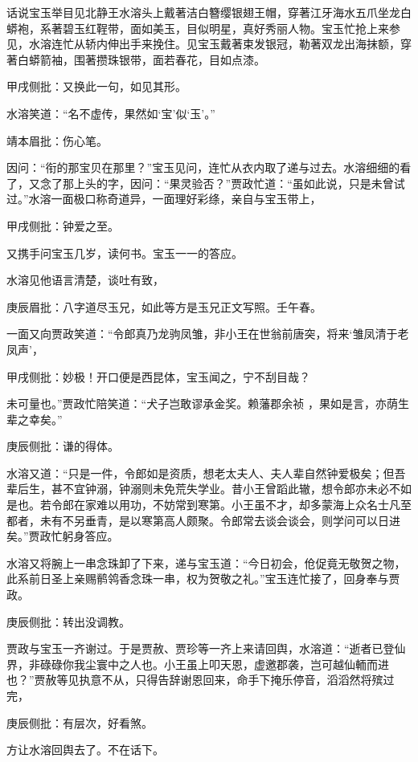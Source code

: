 \begin{parag}
    话说宝玉举目见北静王水溶头上戴著洁白簪缨银翅王帽，穿著江牙海水五爪坐龙白蟒袍，系著碧玉红鞓带，面如美玉，目似明星，真好秀丽人物。宝玉忙抢上来参见，水溶连忙从轿内伸出手来挽住。见宝玉戴著束发银冠，勒著双龙出海抹额，穿著白蟒箭袖，围著攒珠银带，面若春花，目如点漆。\begin{note}甲戌侧批：又换此一句，如见其形。\end{note}水溶笑道：“名不虚传，果然如‘宝’似‘玉’。”\begin{note}靖本眉批：伤心笔。\end{note}因问：“衔的那宝贝在那里？”宝玉见问，连忙从衣内取了递与过去。水溶细细的看了，又念了那上头的字，因问：“果灵验否？”贾政忙道：“虽如此说，只是未曾试过。”水溶一面极口称奇道异，一面理好彩绦，亲自与宝玉带上，\begin{note}甲戌侧批：钟爱之至。\end{note}又携手问宝玉几岁，读何书。宝玉一一的答应。
\end{parag}


\begin{parag}
    水溶见他语言清楚，谈吐有致，\begin{note}庚辰眉批：八字道尽玉兄，如此等方是玉兄正文写照。壬午春。\end{note}一面又向贾政笑道：“令郎真乃龙驹凤雏，非小王在世翁前唐突，将来‘雏凤清于老凤声’，\begin{note}甲戌侧批：妙极！开口便是西昆体，宝玉闻之，宁不刮目哉？\end{note}未可量也。”贾政忙陪笑道：“犬子岂敢谬承金奖。赖藩郡余祯 ，果如是言，亦荫生辈之幸矣。”\begin{note}庚辰侧批：谦的得体。\end{note}水溶又道：“只是一件，令郎如是资质，想老太夫人、夫人辈自然钟爱极矣；但吾辈后生，甚不宜钟溺，钟溺则未免荒失学业。昔小王曾蹈此辙，想令郎亦未必不如是也。若令郎在家难以用功，不妨常到寒第。小王虽不才，却多蒙海上众名士凡至都者，未有不另垂青，是以寒第高人颇聚。令郎常去谈会谈会，则学问可以日进矣。”贾政忙躬身答应。
\end{parag}


\begin{parag}
    水溶又将腕上一串念珠卸了下来，递与宝玉道：“今日初会，伧促竟无敬贺之物，此系前日圣上亲赐鹡鸰香念珠一串，权为贺敬之礼。”宝玉连忙接了，回身奉与贾政。\begin{note}庚辰侧批：转出没调教。\end{note}贾政与宝玉一齐谢过。于是贾赦、贾珍等一齐上来请回舆，水溶道：“逝者已登仙界，非碌碌你我尘寰中之人也。小王虽上叩天恩，虚邀郡袭，岂可越仙輀而进也？”贾赦等见执意不从，只得告辞谢恩回来，命手下掩乐停音，滔滔然将殡过完，\begin{note}庚辰侧批：有层次，好看煞。\end{note}方让水溶回舆去了。不在话下。
\end{parag}


